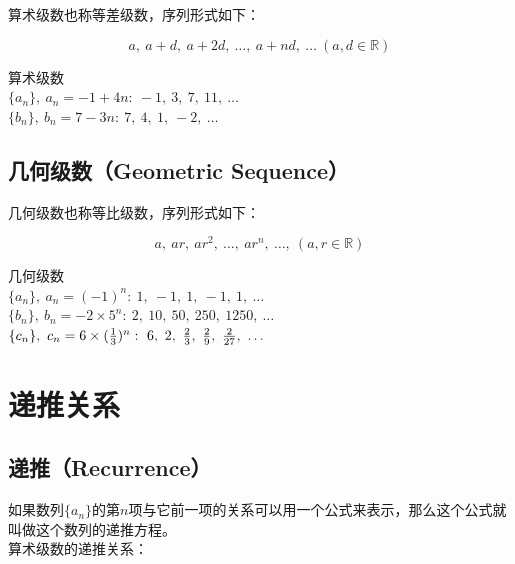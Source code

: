 \documentclass[12pt, openany, oneside]{book}
\begin{document}
算术级数也称等差级数，序列形式如下：

\vspace{-0.5cm}

$$
	a,\ a + d,\ a + 2d,\ \dots,\ a + nd,\ \dots\ (a, d \in \mathbb{R})
$$

\begin{tcolorbox}
	算术级数\\
	$ \{a_n\},\ a_n = -1 + 4n:\ -1,\ 3,\ 7,\ 11,\ \dots $\\
	$ \{b_n\},\ b_n = 7 - 3n:\ 7,\ 4,\ 1,\ -2,\ \dots $
\end{tcolorbox}

\vspace{0.5cm}

\subsection{几何级数（Geometric Sequence）}

几何级数也称等比级数，序列形式如下：

\vspace{-0.5cm}

$$
	a,\ ar,\ ar^2,\ \dots,\ ar^n,\ \dots,\ (a, r \in \mathbb{R})
$$

\begin{tcolorbox}
	几何级数\\
	$ \{a_n\},\ a_n = (-1)^n:\ 1,\ -1,\ 1,\ -1,\ 1,\ \dots $\\
	$ \{b_n\},\ b_n = -2 \times 5^n:\ 2,\ 10,\ 50,\ 250,\ 1250,\ \dots $\\
	$ \{c_n\},\ c_n = 6 \times ({1 \over 3})^n:\ 6,\ 2,\ {2 \over 3},\ {2 \over 9},\ {2 \over 27},\ \dots $
\end{tcolorbox}

\newpage

\section{递推关系}

\subsection{递推（Recurrence）}

如果数列$ \{a_n\} $的第$ n $项与它前一项的关系可以用一个公式来表示，那么这个公式就叫做这个数列的递推方程。\\

算术级数的递推关系：

\vspace{-1.5cm}
\end{document}
